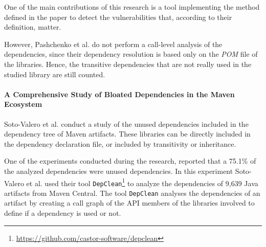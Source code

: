 One of the main contributions of this research is a tool implementing the method defined in the paper to detect the vulnerabilities that, according to their definition, matter.

However, Pashchenko et al. do not perform a call-level analysis of the dependencies, since their dependency resolution is based only on the \textit{POM} file of the libraries. Hence, the transitive dependencies that are not really used in the studied library are still counted.

\paragraph{A Comprehensive Study of Bloated Dependencies in the Maven Ecosystem \cite{soto2020comprehensive}}
Soto-Valero et al. conduct a study of the unused dependencies included in the dependency tree of Maven artifacts. These libraries can be directly included in the dependency declaration file, or included by transitivity or inheritance.

One of the experiments conducted during the research, reported that a 75.1\% of the analyzed dependencies were unused dependencies. In this experiment Soto-Valero et al. used their tool \texttt{DepClean}\footnote{\href{https://github.com/castor-software/depclean}{https://github.com/castor-software/depclean}} to analyze the dependencies of 9,639 Java artifacts from Maven Central.
The tool \texttt{DepClean} analyses the dependencies of an artifact by creating a call graph of the API members of the libraries involved to define if a dependency is used or not.




